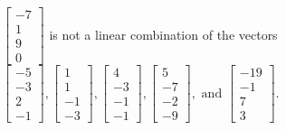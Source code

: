 \begin{exercise}
\begin{exerciseStatement}
  \end{exerciseStatement}
  \begin{exerciseAnswer}
   \(\left[\begin{array}{c}
-7 \\
1 \\
9 \\
0
\end{array}\right]\) 
  	 is not  
	a linear combination of the vectors \(\left[\begin{array}{c}
-5 \\
-3 \\
2 \\
-1
\end{array}\right] , \left[\begin{array}{c}
1 \\
1 \\
-1 \\
-3
\end{array}\right] , \left[\begin{array}{c}
4 \\
-3 \\
-1 \\
-1
\end{array}\right] , \left[\begin{array}{c}
5 \\
-7 \\
-2 \\
-9
\end{array}\right] , \text{ and } \left[\begin{array}{c}
-19 \\
-1 \\
7 \\
3
\end{array}\right]\).

	
  


  \end{exerciseAnswer}
\end{exercise}